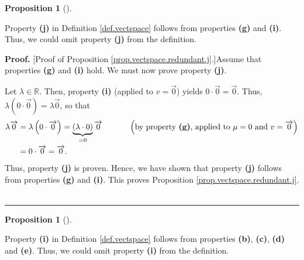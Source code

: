 \documentclass[numbers=enddot,12pt,final,onecolumn,notitlepage]{scrartcl}%
\theoremstyle{definition}
\newtheorem{prop}[theo]{Proposition}
\newenvironment{proposition}[1][]
{\begin{prop}[#1]\begin{leftbar}}
{\end{leftbar}\end{prop}}
\newenvironment{proof}[1][Proof]{\noindent\textbf{#1.} }{\ \rule{0.5em}{0.5em}}
\begin{document}
\begin{proposition}
\label{prop.vectspace.redundant.j}Property \textbf{(j)} in Definition
\ref{def.vectspace} follows from properties \textbf{(g)} and \textbf{(i)}.
Thus, we could omit property \textbf{(j)} from the definition.
\end{proposition}

\begin{proof}
[Proof of Proposition \ref{prop.vectspace.redundant.j}.]Assume that properties
\textbf{(g)} and \textbf{(i)} hold. We must now prove property \textbf{(j)}.

Let $\lambda\in\mathbb{R}$. Then, property \textbf{(i)} (applied to
$v=\overrightarrow{0}$) yields $0\cdot\overrightarrow{0}=\overrightarrow{0}$.
Thus, $\lambda\left(  0\cdot\overrightarrow{0}\right)  =\lambda
\overrightarrow{0}$, so that%
\begin{align*}
\lambda\overrightarrow{0}  &  =\lambda\left(  0\cdot\overrightarrow{0}\right)
=\underbrace{\left(  \lambda\cdot0\right)  }_{=0}\overrightarrow{0}%
\ \ \ \ \ \ \ \ \ \ \left(  \text{by property \textbf{(g)}, applied to }%
\mu=0\text{ and }v=\overrightarrow{0}\right) \\
&  =0\cdot\overrightarrow{0}=\overrightarrow{0}.
\end{align*}
Thus, property \textbf{(j)} is proven. Hence, we have shown that property
\textbf{(j)} follows from properties \textbf{(g)} and \textbf{(i)}. This
proves Proposition \ref{prop.vectspace.redundant.j}.
\end{proof}

\begin{proposition}
\label{prop.vectspace.redundant.i}Property \textbf{(i)} in Definition
\ref{def.vectspace} follows from properties \textbf{(b)}, \textbf{(c)},
\textbf{(d)} and \textbf{(e)}. Thus, we could omit property \textbf{(i)} from
the definition.
\end{proposition}
\end{document}
